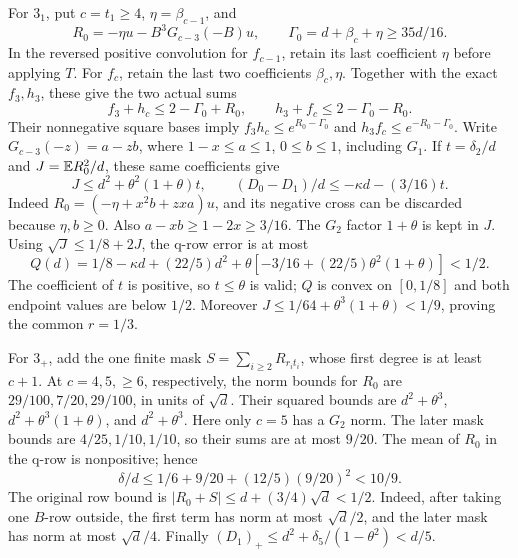 For \(3_1\), put \(c=t_1\ge4\), \(\eta=\beta_{c-1}\), and
\[
 R_0=-\eta u-B^3G_{c-3}(-B)u,\qquad
 \Gamma_0=d+\beta_c+\eta\ge35d/16.
\]
In the reversed positive convolution for \(f_{c-1}\), retain its
last coefficient \(\eta\) before applying \(T\).
For \(f_c\), retain the last two coefficients \(\beta_c,\eta\).
Together with the exact \(f_3,h_3\), these give the two actual sums
\[
 f_3+h_c\le2-\Gamma_0+R_0,\qquad
 h_3+f_c\le2-\Gamma_0-R_0 .
\]
Their nonnegative square bases imply
\(f_3h_c\le e^{R_0-\Gamma_0}\) and
\(h_3f_c\le e^{-R_0-\Gamma_0}\).
Write \(G_{c-3}(-z)=a-zb\), where
\(1-x\le a\le1\), \(0\le b\le1\), including \(G_1\).
If \(t=\delta_2/d\) and \(J=\mathbb E R_0^2/d\), these same coefficients give
\[
 J\le d^2+\theta^2(1+\theta)t,\qquad
 (D_0-D_1)/d\le-\kappa d-(3/16)t.
\]
Indeed \(R_0=(-\eta+x^2b+zxa)u\), and its negative cross can be
discarded because \(\eta,b\ge0\). Also
\(a-xb\ge1-2x\ge3/16\).
The \(G_2\) factor \(1+\theta\) is kept in \(J\).
Using \(\sqrt J\le1/8+2J\), the q-row error is at most
\[
 Q(d)=1/8-\kappa d+(22/5)d^2+
       \theta[-3/16+(22/5)\theta^2(1+\theta)]<1/2 .
\]
The coefficient of \(t\) is positive, so \(t\le\theta\) is valid;
\(Q\) is convex on \([0,1/8]\) and both endpoint values are below
\(1/2\). Moreover \(J\le1/64+\theta^3(1+\theta)<1/9\),
proving the common \(r=1/3\).

For \(3_+\), add the one finite mask
\(S=\sum_{i\ge2}R_{r_it_i}\), whose first degree is at least \(c+1\).
At \(c=4,5,\ge6\), respectively, the norm bounds for \(R_0\) are
\(29/100,7/20,29/100\), in units of \(\sqrt d\).
Their squared bounds are \(d^2+\theta^3\),
\(d^2+\theta^3(1+\theta)\), and \(d^2+\theta^3\).
Here only \(c=5\) has a \(G_2\) norm. The later mask bounds are
\(4/25,1/10,1/10\), so their sums are at most \(9/20\).
The mean of \(R_0\) in the q-row is nonpositive; hence
\[
 \delta/d\le1/6+9/20+(12/5)(9/20)^2<10/9.
\]
The original row bound is
\(|R_0+S|\le d+(3/4)\sqrt d<1/2\).
Indeed, after taking one \(B\)-row outside, the first term has norm
at most \(\sqrt d/2\), and the later mask has norm at most
\(\sqrt d/4\).
Finally
\((D_1)_+\le d^2+\delta_5/(1-\theta^2)<d/5\).

